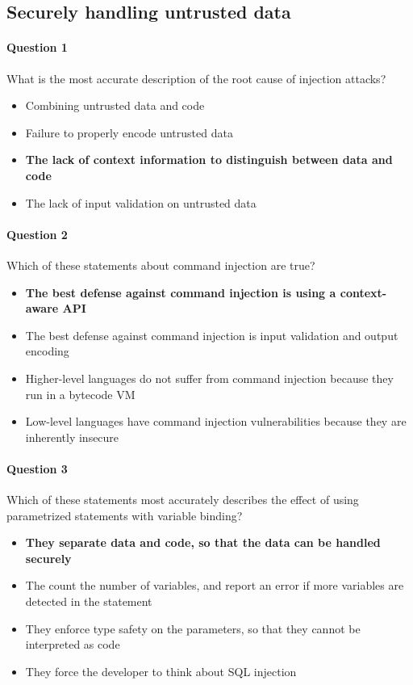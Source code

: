 \documentclass[titlepage]{article}
\begin{document}
    \subsection{Securely handling untrusted data}
    \paragraph{Question 1} What is the most accurate description of the root cause of injection attacks?
    \begin{itemize}
        \item Combining untrusted data and code
        \item Failure to properly encode untrusted data
        \item \textbf{The lack of context information to distinguish between data and code} \checkmark
        \item The lack of input validation on untrusted data
    \end{itemize}
    \paragraph{Question 2} Which of these statements about command injection are true?
    \begin{itemize}
        \item \textbf{The best defense against command injection is using a context-aware API} \checkmark
        \item The best defense against command injection is input validation and output encoding
        \item Higher-level languages do not suffer from command injection because they run in a bytecode VM
        \item Low-level languages have command injection vulnerabilities because they are inherently insecure
    \end{itemize}
    \paragraph{Question 3} Which of these statements most accurately describes the effect of using parametrized statements with variable binding?
    \begin{itemize}
        \item \textbf{They separate data and code, so that the data can be handled securely} \checkmark
        \item The count the number of variables, and report an error if more variables are detected in the statement
        \item They enforce type safety on the parameters, so that they cannot be interpreted as code
        \item They force the developer to think about SQL injection
    \end{itemize}
\end{document}
